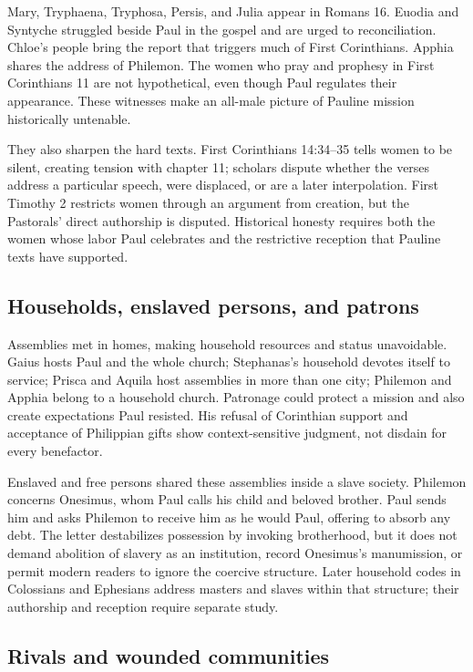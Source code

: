 Mary, Tryphaena, Tryphosa, Persis, and Julia appear in Romans 16. Euodia and
Syntyche struggled beside Paul in the gospel and are urged to reconciliation.
Chloe's people bring the report that triggers much of First Corinthians.
Apphia shares the address of Philemon. The women who pray and prophesy in
First Corinthians 11 are not hypothetical, even though Paul regulates their
appearance. These witnesses make an all-male picture of Pauline mission
historically untenable.

They also sharpen the hard texts. First Corinthians 14:34--35 tells women to
be silent, creating tension with chapter 11; scholars dispute whether the
verses address a particular speech, were displaced, or are a later
interpolation. First Timothy 2 restricts women through an argument from
creation, but the Pastorals' direct authorship is disputed. Historical honesty
requires both the women whose labor Paul celebrates and the restrictive
reception that Pauline texts have supported.

\subsection{Households, enslaved persons, and patrons}

Assemblies met in homes, making household resources and status unavoidable.
Gaius hosts Paul and the whole church; Stephanas's household devotes itself to
service; Prisca and Aquila host assemblies in more than one city; Philemon and
Apphia belong to a household church. Patronage could protect a mission and
also create expectations Paul resisted. His refusal of Corinthian support and
acceptance of Philippian gifts show context-sensitive judgment, not disdain
for every benefactor.

Enslaved and free persons shared these assemblies inside a slave society.
Philemon concerns Onesimus, whom Paul calls his child and beloved brother. Paul
sends him and asks Philemon to receive him as he would Paul, offering to absorb
any debt. The letter destabilizes possession by invoking brotherhood, but it
does not demand abolition of slavery as an institution, record Onesimus's
manumission, or permit modern readers to ignore the coercive structure.
Later household codes in Colossians and Ephesians address masters and slaves
within that structure; their authorship and reception require separate study.

\subsection{Rivals and wounded communities}

